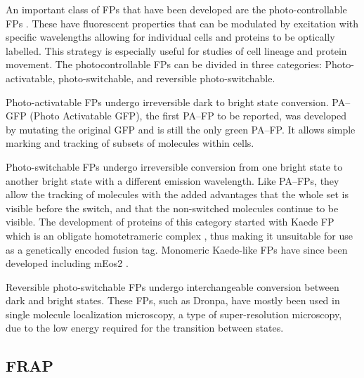     An important class of FPs that have been developed are the
    photo-controllable FPs \citep{shcherbakova2014photocontrollable}.
    These have
    fluorescent properties that can be modulated by excitation with specific
    wavelengths allowing for individual cells and proteins to be optically
    labelled.  This strategy is especially useful for studies of cell
    lineage and protein movement.
    The photocontrollable FPs can be divided in three categories:
    Photo-activatable, photo-switchable, and reversible photo-switchable.


    Photo-activatable FPs undergo
        irreversible dark to bright state conversion.
        PA--GFP (Photo Activatable GFP), the first PA--FP to be
        reported, was developed by mutating the original GFP
        \citep{pagfp-discovery} and is
        still the only green PA--FP.
        It allows simple marking and tracking of subsets of molecules
        within cells.

    Photo-switchable FPs undergo
        irreversible conversion from one bright state to another bright
        state with a different emission wavelength.
        Like PA--FPs, they allow the tracking of
        molecules with the added advantages that the whole set is visible
        before the switch, and that the non-switched molecules continue
        to be visible.
        The development of proteins of this category started with Kaede FP
        which is an obligate homotetrameric
        complex \citep{kaede-discovery}, thus making it
        unsuitable for use as a genetically encoded fusion tag.
        Monomeric Kaede-like FPs have since been developed including
        mEos2 \citep{meos2-discovery}.

    Reversible photo-switchable FPs undergo
        interchangeable conversion between dark and bright states.
        These FPs, such as Dronpa, have mostly been used in
        single molecule localization
        microscopy, a type of super-resolution microscopy, due to the
        low energy required for the transition between states.

  \subsection{FRAP}

